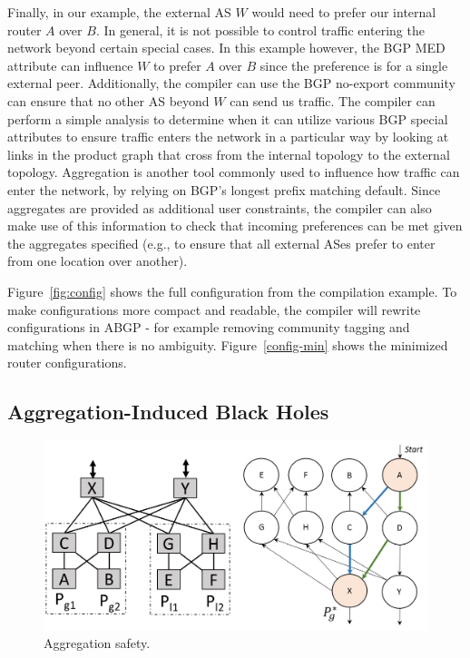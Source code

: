 Finally, in our example, the external AS $W$ would need to prefer our internal router $A$ over $B$. In general, it is not possible to control traffic entering the network beyond certain special cases. In this example however, the BGP MED attribute can influence $W$ to prefer $A$ over $B$ since the preference is for a single external peer.  Additionally, the compiler can use the BGP no-export community can ensure that no other AS beyond $W$ can send us traffic. The compiler can perform a simple analysis to determine when it can utilize various BGP special attributes to ensure traffic enters the network in a particular way by looking at links in the product graph that cross from the internal topology to the external topology. Aggregation is another tool commonly used to influence how traffic can enter the network, by relying on BGP's longest prefix matching default. Since aggregates are provided as additional user constraints, the compiler can also make use of this information to check that incoming preferences can be met given the aggregates specified (e.g., to ensure that all external ASes prefer to enter from one location over another).

Figure~\ref{fig:config} shows the full configuration from the compilation example. To make configurations more compact and readable, the \sysname compiler will rewrite configurations in ABGP - for example removing community tagging and matching when there is no ambiguity. Figure~\ref{config-min} shows the minimized router configurations.



\subsection{Aggregation-Induced Black Holes}

\begin{figure}[t!]
\centering
\includegraphics[width=\columnwidth]{figures/aggregation}
\caption{Aggregation safety.}
\label{fig:aggregation-safety}
\end{figure}

